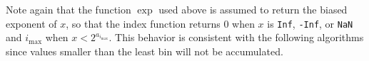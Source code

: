     Note again that the function $\exp$ used above is assumed to return the biased exponent of $x$, so that the index function returns 0 when $x$ is \texttt{Inf}, \texttt{-Inf}, or \texttt{NaN} and $i_{\max}$ when $x < 2^{a_{i_{\max}}}$.
    This behavior is consistent with the following algorithms since values smaller than the least bin will not be accumulated.
